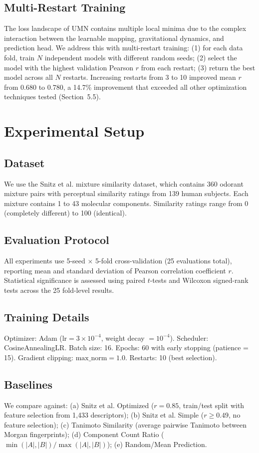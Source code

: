 \documentclass[11pt,a4paper]{article}
\begin{document}
\subsection{Multi-Restart Training}
The loss landscape of UMN contains multiple local minima due to the complex interaction between the learnable mapping, gravitational dynamics, and prediction head. We address this with multi-restart training: (1) for each data fold, train $N$ independent models with different random seeds; (2) select the model with the highest validation Pearson $r$ from each restart; (3) return the best model across all $N$ restarts. Increasing restarts from 3 to 10 improved mean $r$ from 0.680 to 0.780, a 14.7\% improvement that exceeded all other optimization techniques tested (Section~5.5).

\section{Experimental Setup}

\subsection{Dataset}
We use the Snitz et al. \cite{snitz2013} mixture similarity dataset, which contains 360 odorant mixture pairs with perceptual similarity ratings from 139 human subjects. Each mixture contains 1 to 43 molecular components. Similarity ratings range from 0 (completely different) to 100 (identical).

\subsection{Evaluation Protocol}
All experiments use 5-seed $\times$ 5-fold cross-validation (25 evaluations total), reporting mean and standard deviation of Pearson correlation coefficient $r$. Statistical significance is assessed using paired $t$-tests and Wilcoxon signed-rank tests across the 25 fold-level results.

\subsection{Training Details}
Optimizer: Adam ($\text{lr} = 3 \times 10^{-4}$, weight decay $= 10^{-4}$). Scheduler: CosineAnnealingLR. Batch size: 16. Epochs: 60 with early stopping (patience = 15). Gradient clipping: $\text{max\_norm} = 1.0$. Restarts: 10 (best selection).

\subsection{Baselines}
We compare against: (a) Snitz et al. \cite{snitz2013} Optimized ($r = 0.85$, train/test split with feature selection from 1,433 descriptors); (b) Snitz et al. \cite{snitz2013} Simple ($r \geq 0.49$, no feature selection); (c) Tanimoto Similarity (average pairwise Tanimoto between Morgan fingerprints); (d) Component Count Ratio ($\min(|A|, |B|) / \max(|A|, |B|)$); (e) Random/Mean Prediction.
\end{document}
